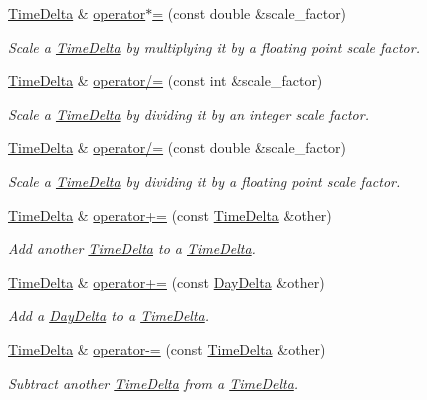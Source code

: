 \begin{DoxyCompactItemize}
\hyperlink{structTimeDelta}{Time\-Delta} \& \hyperlink{structTimeDelta_a8301b98264ca9539a160a756e4014559}{operator$\ast$=} (const double \&scale\-\_\-factor)
\begin{DoxyCompactList}\small\item\em Scale a \hyperlink{structTimeDelta}{Time\-Delta} by multiplying it by a floating point scale factor. \end{DoxyCompactList}\item 
\hyperlink{structTimeDelta}{Time\-Delta} \& \hyperlink{structTimeDelta_ac3180211824572ea2f198ca1ad6887c9}{operator/=} (const int \&scale\-\_\-factor)
\begin{DoxyCompactList}\small\item\em Scale a \hyperlink{structTimeDelta}{Time\-Delta} by dividing it by an integer scale factor. \end{DoxyCompactList}\item 
\hyperlink{structTimeDelta}{Time\-Delta} \& \hyperlink{structTimeDelta_ae514c2f5fa4266b53bb0220b89e50e54}{operator/=} (const double \&scale\-\_\-factor)
\begin{DoxyCompactList}\small\item\em Scale a \hyperlink{structTimeDelta}{Time\-Delta} by dividing it by a floating point scale factor. \end{DoxyCompactList}\item 
\hyperlink{structTimeDelta}{Time\-Delta} \& \hyperlink{structTimeDelta_ae8d415b1d359e1f6c6a68ee3c44ea21e}{operator+=} (const \hyperlink{structTimeDelta}{Time\-Delta} \&other)
\begin{DoxyCompactList}\small\item\em Add another \hyperlink{structTimeDelta}{Time\-Delta} to a \hyperlink{structTimeDelta}{Time\-Delta}. \end{DoxyCompactList}\item 
\hyperlink{structTimeDelta}{Time\-Delta} \& \hyperlink{structTimeDelta_acf4db7ce2e954d9a706f3e85cd805e42}{operator+=} (const \hyperlink{structDayDelta}{Day\-Delta} \&other)
\begin{DoxyCompactList}\small\item\em Add a \hyperlink{structDayDelta}{Day\-Delta} to a \hyperlink{structTimeDelta}{Time\-Delta}. \end{DoxyCompactList}\item 
\hyperlink{structTimeDelta}{Time\-Delta} \& \hyperlink{structTimeDelta_adcacf2fa162c98c9a8c7278f0e32ce56}{operator-\/=} (const \hyperlink{structTimeDelta}{Time\-Delta} \&other)
\begin{DoxyCompactList}\small\item\em Subtract another \hyperlink{structTimeDelta}{Time\-Delta} from a \hyperlink{structTimeDelta}{Time\-Delta}. \end{DoxyCompactList}\item 

\end{DoxyCompactItemize}

